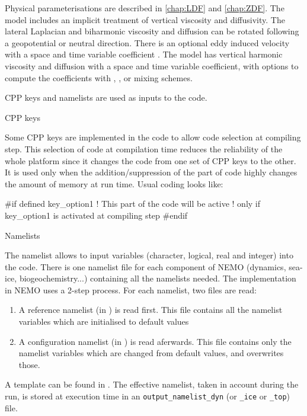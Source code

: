 \documentclass[../main/NEMO_manual]{subfiles}
\begin{document}
Physical parameterisations are described in \autoref{chap:LDF} and \autoref{chap:ZDF}.
The model includes an implicit treatment of vertical viscosity and diffusivity.
The lateral Laplacian and biharmonic viscosity and diffusion can be rotated following
a geopotential or neutral direction.
There is an optional eddy induced velocity \citep{Gent1990} with a space and time variable coefficient
\citet{Treguier1997}.
The model has vertical harmonic viscosity and diffusion with a space and time variable coefficient,
with options to compute the coefficients with \citet{Blanke1993}, \citet{Pacanowski_Philander_JPO81}, or 
\citet{Umlauf_Burchard_JMS03} mixing schemes.
 
\noindent CPP keys and namelists are used as inputs to the code.

\noindent {} CPP keys

Some CPP keys are implemented in the \fortran code to allow code selection at compiling step.
This selection of code at compilation time reduces the reliability of the whole platform since
it changes the code from one set of CPP keys to the other.
It is used only when the addition/suppression of the part of code highly changes the amount of memory at run time.
Usual coding looks like: 

\begin{forlines}
#if defined key_option1
	! This part of the \fortran code will be active
	! only if key_option1 is activated at compiling step
#endif
\end{forlines}

\noindent {} Namelists

The namelist allows to input variables (character, logical, real and integer) into the code.
There is one namelist file for each component of NEMO (dynamics, sea-ice, biogeochemistry...)
containing all the \fortran namelists needed.
The implementation in NEMO uses a 2-step process. 
For each \fortran namelist, two files are read:

\begin{enumerate}
\item
  A reference namelist (in ) is read first.
  This file contains all the namelist variables which are initialised to default values
\item
  A configuration namelist (in ) is read aferwards.
  This file contains only the namelist variables which are changed from default values, and overwrites those.
\end{enumerate}
A template can be found in .
The effective namelist, taken in account during the run, is stored at execution time in
an \texttt{output\_namelist\_dyn} (or \texttt{\_ice} or \texttt{\_top}) file.
\end{document}
